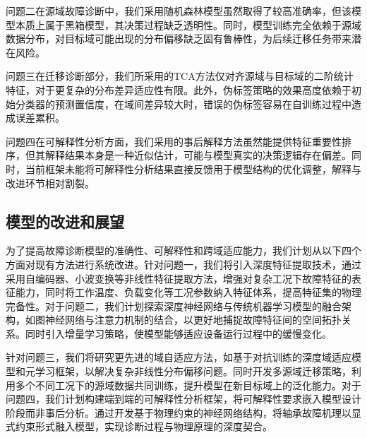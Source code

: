 \documentclass[a4paper]{CPIPC}
\numberwithin{equation}{section}
\begin{document}
问题二在源域故障诊断中，我们采用随机森林模型虽然取得了较高准确率，但该模型本质上属于黑箱模型，其决策过程缺乏透明性。同时，模型训练完全依赖于源域数据分布，对目标域可能出现的分布偏移缺乏固有鲁棒性，为后续迁移任务带来潜在风险。

问题三在迁移诊断部分，我们所采用的TCA方法仅对齐源域与目标域的二阶统计特征，对于更复杂的分布差异适应性有限。此外，伪标签策略的效果高度依赖于初始分类器的预测置信度，在域间差异较大时，错误的伪标签容易在自训练过程中造成误差累积。

问题四在可解释性分析方面，我们采用的事后解释方法虽然能提供特征重要性排序，但其解释结果本身是一种近似估计，可能与模型真实的决策逻辑存在偏差。同时，当前框架未能将可解释性分析结果直接反馈用于模型结构的优化调整，解释与改进环节相对割裂。
\subsection{模型的改进和展望}
为了提高故障诊断模型的准确性、可解释性和跨域适应能力，我们计划从以下四个方面对现有方法进行系统改进。针对问题一，我们将引入深度特征提取技术，通过采用自编码器、小波变换等非线性特征提取方法，增强对复杂工况下故障特征的表征能力，同时将工作温度、负载变化等工况参数纳入特征体系，提高特征集的物理完备性。对于问题二，我们计划探索深度神经网络与传统机器学习模型的融合架构，如图神经网络与注意力机制的结合，以更好地捕捉故障特征间的空间拓扑关系。同时引入增量学习策略，使模型能够适应设备运行过程中的缓慢变化。

针对问题三，我们将研究更先进的域自适应方法，如基于对抗训练的深度域适应模型和元学习框架，以解决复杂非线性分布偏移问题。同时开发多源域迁移策略，利用多个不同工况下的源域数据共同训练，提升模型在新目标域上的泛化能力。对于问题四，我们计划构建端到端的可解释性分析框架，将可解释性要求嵌入模型设计阶段而非事后分析。通过开发基于物理约束的神经网络结构，将轴承故障机理以显式约束形式融入模型，实现诊断过程与物理原理的深度契合。
\end{document}
